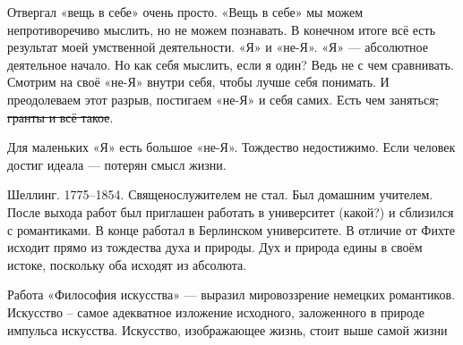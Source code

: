 Отвергал «вещь в себе» очень просто. «Вещь в себе» мы можем непротиворечиво мыслить, но не можем познавать. В конечном итоге всё есть результат моей умственной деятельности.
«Я» и «не-\!Я». 
«Я» --- абсолютное деятельное начало. Но как себя мыслить, если я один? Ведь не с чем сравнивать. Смотрим на своё «не-\!Я» внутри себя, чтобы лучше себя понимать. И преодолеваем этот разрыв, постигаем «не-\!Я» и себя самих. Есть чем заняться\sout{, гранты и всё такое}.

Для маленьких «Я» есть большое «не-\!Я».
Тождество недостижимо. Если человек достиг идеала --- потерян смысл жизни.


Шеллинг. 1775--1854. 
Священослужителем не стал. Был домашним учителем. После выхода работ был приглашен работать в университет (какой?) и сблизился с романтиками. В конце работал в Берлинском университете. В отличие от Фихте исходит прямо из тождества духа и природы. Дух и природа едины в своём истоке, поскольку оба исходят из абсолюта.

Работа «Философия искусства» --- выразил мировоззрение немецких романтиков. Искусство -- самое адекватное изложение исходного, заложенного в природе импульса искусства. Искусство, изображающее жизнь, стоит выше самой жизни

